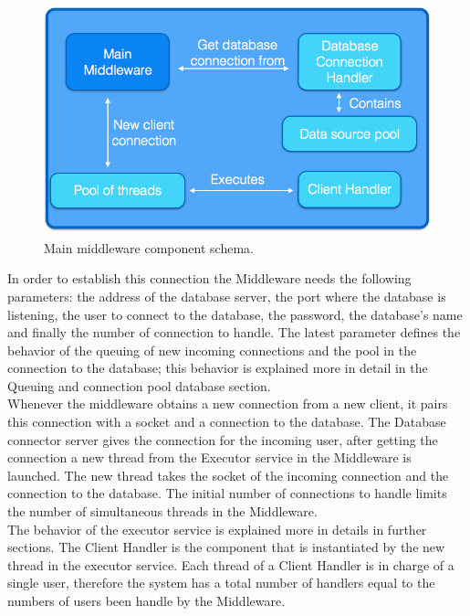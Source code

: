 \begin{figure}[h!]
	\centering
	\includegraphics[scale=0.3]{midleware.png}
	\caption{Main middleware component schema.}
	\label{middle}
\end{figure}


In order to establish this connection the Middleware needs the following parameters: the address of the database server, the port where the database is listening, the user to connect to the database, the password, the database’s name and finally the number of connection to handle. The latest parameter defines the behavior of the queuing of new incoming connections and the pool in the connection to the database; this behavior is explained more in detail in the Queuing and connection pool database section.\\
 
Whenever the middleware obtains a new connection from a new client, it pairs this connection with a socket and a connection to the database. The Database connector server gives the connection for the incoming user, after getting the connection a new thread from the Executor service in the Middleware is launched. The new thread takes the socket of the incoming connection and the connection to the database. The initial number of connections to handle limits the number of simultaneous threads in the Middleware.\\

The behavior of the executor service is explained more in details in further sections. The Client Handler is the component that is instantiated by the new thread in the executor service. Each thread of a Client Handler is in charge of a single user, therefore the system has a total number of handlers equal to the numbers of users been handle by the Middleware.\\


